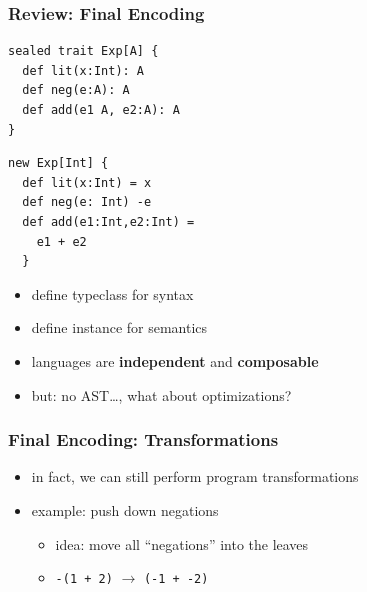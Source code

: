 \documentclass{beamer}
\begin{document}
\begin{frame}[fragile]
  \frametitle{Review: Final Encoding}
  \begin{minipage}[frame=none]{0.45\linewidth}
\begin{verbatim}
sealed trait Exp[A] {
  def lit(x:Int): A
  def neg(e:A): A
  def add(e1 A, e2:A): A
}
\end{verbatim}
  \end{minipage}
  \begin{minipage}[frame=none]{0.45\linewidth}
\begin{verbatim}
new Exp[Int] {
  def lit(x:Int) = x
  def neg(e: Int) -e
  def add(e1:Int,e2:Int) =
    e1 + e2
  }
\end{verbatim}
  \end{minipage}
  \begin{itemize}
  \item define typeclass for syntax
  \item define instance for semantics
  \item languages are \textbf{independent} and \textbf{composable}
  \item but: no AST\ldots, what about optimizations?
  \end{itemize}
\end{frame}

\begin{frame}
  \frametitle{Final Encoding: Transformations}
  \begin{itemize}
  \item in fact, we can still perform program transformations
  \item example: push down negations
    \begin{itemize}
    \item idea: move all ``negations'' into the leaves
    \item \texttt{-(1 + 2)} $\rightarrow$ \texttt{(-1 + -2)}
    \end{itemize}
  \end{itemize}
\end{frame}
\end{document}

